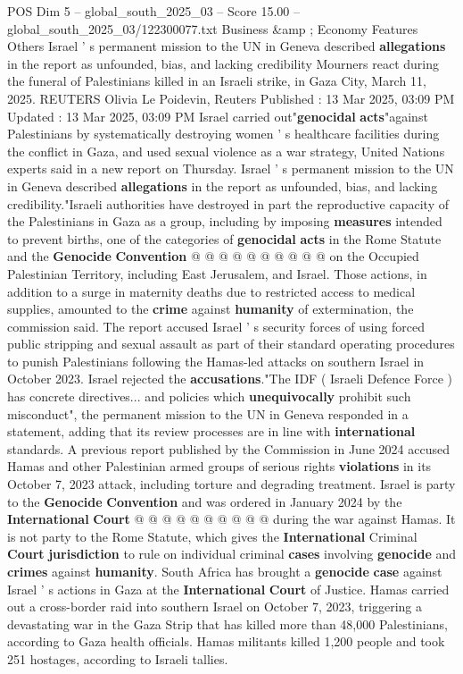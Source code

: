 \begin{textsample}{POS Dim 5 – global\_south\_2025\_03 – Score 15.00 – global\_south\_2025\_03/122300077.txt}  \label{ex:f5_pos_184}
Business \&amp ; Economy Features Others Israel ' s permanent mission to the UN in Geneva described \textbf{allegations} in the report as unfounded, bias, and lacking credibility Mourners react during the funeral of Palestinians killed in an Israeli strike, in Gaza City, March 11, 2025.
REUTERS Olivia Le Poidevin, Reuters Published : 13 Mar 2025, 03:09 PM Updated : 13 Mar 2025, 03:09 PM Israel carried out"\textbf{genocidal} \textbf{acts}"against Palestinians by systematically destroying women ' s healthcare facilities during the conflict in Gaza, and used sexual violence as a war strategy, United Nations experts said in a new report on Thursday.
Israel ' s permanent mission to the UN in Geneva described \textbf{allegations} in the report as unfounded, bias, and lacking credibility."Israeli authorities have destroyed in part the reproductive capacity of the Palestinians in Gaza as a group, including by imposing \textbf{measures} intended to prevent births, one of the categories of \textbf{genocidal} \textbf{acts} in the Rome Statute and the \textbf{Genocide} \textbf{Convention} @ @ @ @ @ @ @ @ @ @ on the Occupied Palestinian Territory, including East Jerusalem, and Israel.
Those actions, in addition to a surge in maternity deaths due to restricted access to medical supplies, amounted to the \textbf{crime} against \textbf{humanity} of extermination, the commission said.
The report accused Israel ' s security forces of using forced public stripping and sexual assault as part of their standard operating procedures to punish Palestinians following the Hamas-led attacks on southern Israel in October 2023.
Israel rejected the \textbf{accusations}."The IDF ( Israeli Defence Force ) has concrete directives... and policies which \textbf{unequivocally} prohibit such misconduct", the permanent mission to the UN in Geneva responded in a statement, adding that its review processes are in line with \textbf{international} standards.
A previous report published by the Commission in June 2024 accused Hamas and other Palestinian armed groups of serious rights \textbf{violations} in its October 7, 2023 attack, including torture and degrading treatment.
Israel is party to the \textbf{Genocide} \textbf{Convention} and was ordered in January 2024 by the \textbf{International} \textbf{Court} @ @ @ @ @ @ @ @ @ @ during the war against Hamas.
It is not party to the Rome Statute, which gives the \textbf{International} Criminal \textbf{Court} \textbf{jurisdiction} to rule on individual criminal \textbf{cases} involving \textbf{genocide} and \textbf{crimes} against \textbf{humanity}.
South Africa has brought a \textbf{genocide} \textbf{case} against Israel ' s actions in Gaza at the \textbf{International} \textbf{Court} of Justice.
Hamas carried out a cross-border raid into southern Israel on October 7, 2023, triggering a devastating war in the Gaza Strip that has killed more than 48,000 Palestinians, according to Gaza health officials.
Hamas militants killed 1,200 people and took 251 hostages, according to Israeli tallies.


\end{textsample}
